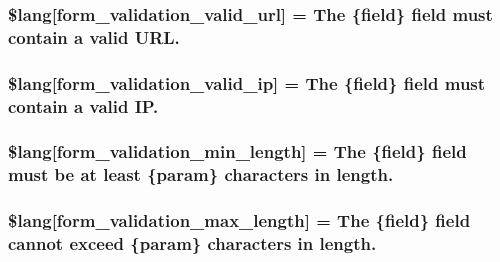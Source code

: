 \subsubsection[{\$lang}]{\setlength{\rightskip}{0pt plus 5cm}\$lang\mbox{[}\textquotesingle{}form\+\_\+validation\+\_\+valid\+\_\+url\textquotesingle{}\mbox{]} = \textquotesingle{}The \{field\} field must contain {\bf a} valid U\+R\+L.\textquotesingle{}}\label{form__validation__lang_8php_af9467e9ed3767f5bff205b79d706fe0a}
\hypertarget{form__validation__lang_8php_a8d9bfb49825972af0deee31f8f9dccf2}{}
\subsubsection[{\$lang}]{\setlength{\rightskip}{0pt plus 5cm}\$lang\mbox{[}\textquotesingle{}form\+\_\+validation\+\_\+valid\+\_\+ip\textquotesingle{}\mbox{]} = \textquotesingle{}The \{field\} field must contain {\bf a} valid I\+P.\textquotesingle{}}\label{form__validation__lang_8php_a8d9bfb49825972af0deee31f8f9dccf2}
\hypertarget{form__validation__lang_8php_a8af94ce29e8a4ac82c976c891b51ffc9}{}
\subsubsection[{\$lang}]{\setlength{\rightskip}{0pt plus 5cm}\$lang\mbox{[}\textquotesingle{}form\+\_\+validation\+\_\+min\+\_\+length\textquotesingle{}\mbox{]} = \textquotesingle{}The \{field\} field must be at least \{param\} characters in length.\textquotesingle{}}\label{form__validation__lang_8php_a8af94ce29e8a4ac82c976c891b51ffc9}
\hypertarget{form__validation__lang_8php_a16f2322f1cb6a1db7a2492d653559522}{}
\subsubsection[{\$lang}]{\setlength{\rightskip}{0pt plus 5cm}\$lang\mbox{[}\textquotesingle{}form\+\_\+validation\+\_\+max\+\_\+length\textquotesingle{}\mbox{]} = \textquotesingle{}The \{field\} field cannot exceed \{param\} characters in length.\textquotesingle{}}\label{form__validation__lang_8php_a16f2322f1cb6a1db7a2492d653559522}
\hypertarget{form__validation__lang_8php_ad6d3daf6617c3906bc88d6801e74c6c5}{}
